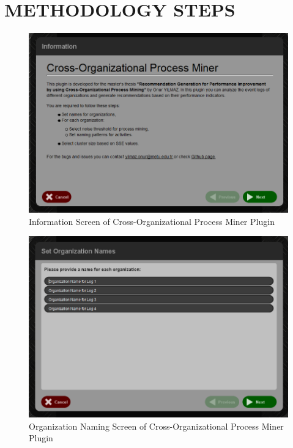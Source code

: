 \chapter{METHODOLOGY STEPS}
\label{chp:methodology-steps}

\begin{figure}
	\centering
	\includegraphics[width=\textwidth]{4_methodology/information-screen}
	\caption{Information Screen of Cross-Organizational Process Miner Plugin}
	\label{fig:information-screen}
\end{figure}
\begin{figure}
	\centering
	\includegraphics[width=\textwidth]{4_methodology/organization-name-screen}
	\caption{Organization Naming Screen of Cross-Organizational Process Miner Plugin}
  \label{fig:organization-name-screen}
\end{figure}

